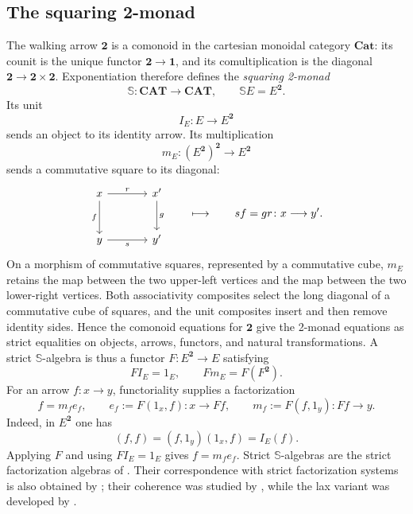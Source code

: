 \documentclass[11pt]{article}
\theoremstyle{plain}
\theoremstyle{definition}
\theoremstyle{remark}
\newcommand{\CAT}{\mathbf{CAT}}
\newcommand{\Cat}{\mathbf{Cat}}
\newcommand{\Sq}{\mathbb{S}}
\numberwithin{equation}{section}
\begin{document}
\subsection{The squaring 2-monad}

The walking arrow $\mathbf 2$ is a comonoid in the cartesian monoidal
category $\Cat$: its counit is the unique functor
$\mathbf 2\to\mathbf 1$, and its comultiplication is the diagonal
$\mathbf 2\to\mathbf 2\times\mathbf 2$.  Exponentiation therefore
defines the \emph{squaring 2-monad}
\begin{equation*}
\Sq\colon\CAT\longrightarrow\CAT,
  \qquad
  \Sq E=E^{\mathbf 2}.
\end{equation*}
Its unit
\begin{equation*}
I_E\colon E\longrightarrow E^{\mathbf 2}
\end{equation*}
sends an object to its identity arrow.  Its multiplication
\begin{equation*}
m_E\colon(E^{\mathbf 2})^{\mathbf 2}\longrightarrow E^{\mathbf 2}
\end{equation*}
sends a commutative square to its diagonal:
\begin{equation}
\begin{tikzcd}[column sep=large,row sep=large]
x \arrow[r,"r"] \arrow[d,"f"']
  & x' \arrow[d,"g"] \\
y \arrow[r,"s"']
  & y'
\end{tikzcd}
\qquad\longmapsto\qquad
sf=gr\colon x\longrightarrow y'.
\label{eq:square-multiplication}
\end{equation}
On a morphism of commutative squares, represented by a commutative
cube, $m_E$ retains the map between the two upper-left vertices and the
map between the two lower-right vertices.  Both associativity composites
select the long diagonal of a commutative cube of squares, and the unit
composites insert and then remove identity sides.  Hence the comonoid
equations for $\mathbf 2$ give the 2-monad equations as strict
equalities on objects, arrows, functors, and natural transformations.
A strict $\Sq$-algebra is thus a functor
$F\colon E^{\mathbf 2}\to E$ satisfying
\begin{equation}
FI_E=1_E,
  \qquad
  Fm_E=F(F^{\mathbf 2}).
  \label{eq:square-algebra-laws}
\end{equation}
For an arrow $f\colon x\to y$, functoriality supplies a factorization
\begin{equation}
f=m_f e_f,
  \qquad
  e_f:=F(1_x,f)\colon x\to Ff,
  \qquad
  m_f:=F(f,1_y)\colon Ff\to y.
  \label{eq:sq-factorization}
\end{equation}
Indeed, in $E^{\mathbf 2}$ one has
\begin{equation*}
  (f,f)=(f,1_y)(1_x,f)=I_E(f).
\end{equation*}
Applying $F$ and using $FI_E=1_E$ gives $f=m_fe_f$.
Strict $\Sq$-algebras are the strict factorization algebras of
\citet{KorostenskiTholen1993}.  Their correspondence with strict
factorization systems is also obtained by
\citet{RosebrughWood2002Distributive}; their coherence was studied by
\citet{RosebrughWood2002}, while the lax variant was developed by
\citet{RosickyTholen2002}.
\end{document}
